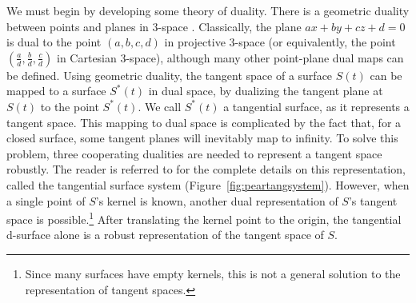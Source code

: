 \documentclass[12pt]{article}
\begin{document}
We must begin by developing some theory of duality.
There is a geometric duality between points and planes in 3-space \cite{hartshorne}.
Classically, the plane $ax+by+cz+d=0$ is dual to the point $(a,b,c,d)$ in projective 3-space
(or equivalently, the point $(\frac{a}{d},\frac{b}{d},\frac{c}{d})$ in Cartesian 3-space),
although many other point-plane dual maps can be defined.
Using geometric duality, the tangent space of a surface $S(t)$ can be mapped 
to a surface $S^*(t)$ in dual space, by dualizing the tangent plane at $S(t)$ to the point $S^*(t)$.
We call $S^*(t)$ a tangential surface, as it represents a tangent space.
This mapping to dual space is complicated by the fact that, for a closed surface,
some tangent planes will inevitably map to infinity.
To solve this problem, 
three cooperating dualities are needed to represent a tangent space robustly.
The reader is referred to \cite{jj02tangsurf} for the complete details
on this representation, called the tangential surface system 
(Figure~\ref{fig:peartangsystem}).
%
%
However, when a single point of $S$'s kernel is known,
another dual representation of $S$'s tangent space is possible.\footnote{Since many
	surfaces have empty kernels, this is not a general solution to
	the representation of tangent spaces.}
After translating the kernel point to the origin,
the tangential d-surface alone is a robust representation of the tangent space of $S$.
\end{document}
